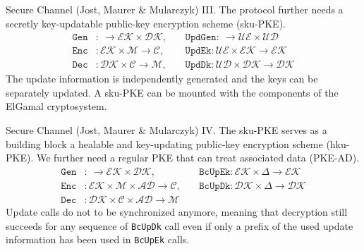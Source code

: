 \documentclass{beamer}
\begin{document}
\begin{frame}{Secure Channel (Jost, Maurer \& Mularczyk) III.}
  The protocol further needs a secretly key-updatable public-key encryption scheme (sku-PKE).
   \begin{align*}
     \texttt{Gen} & : \ \rightarrow \mathcal{EK} \times \mathcal{DK}, \
     && \texttt{UpdGen} : \ \rightarrow \mathcal{UE} \times \mathcal{UD} \\
     \texttt{Enc} & : \mathcal{EK} \times \mathcal{M} \rightarrow \mathcal{C}, \
     && \texttt{UpdEk} : \mathcal{UE} \times \mathcal{EK} \rightarrow \mathcal{EK} \\
     \texttt{Dec} & : \mathcal{DK} \times \mathcal{C} \rightarrow \mathcal{M}, \
     && \texttt{UpdDk} :  \mathcal{UD} \times \mathcal{DK} \rightarrow \mathcal{DK}
  \end{align*}
The update information is independently generated and the keys
can be separately updated. A sku-PKE can be mounted with the
components of the ElGamal cryptosystem.
\end{frame}

\begin{frame}{Secure Channel (Jost, Maurer \& Mularczyk) IV.}
  The sku-PKE serves as a building block a healable and key-updating
  public-key encryption scheme (hku-PKE). We further need a regular
  PKE that can treat associated data (PKE-AD).
  \begin{align*}
    \texttt{Gen} & : \ \rightarrow \mathcal{EK} \times \mathcal{DK}, \ &&
    \texttt{BcUpEk} : \mathcal{EK} \times \Delta \rightarrow \mathcal{EK} \\
    \texttt{Enc} & : \mathcal{EK} \times \mathcal{M} \times \mathcal{AD}
                   \rightarrow \mathcal{C}, \ &&
    \texttt{BcUpDk} : \mathcal{DK} \times \Delta \rightarrow \mathcal{DK} \\
    \texttt{Dec} & : \mathcal{DK} \times \mathcal{C} \times \mathcal{AD}
                   \rightarrow \mathcal{M}
  \end{align*}
  Update calls do not to be synchronized anymore, meaning that decryption still
  succeeds for any sequence of \texttt{BcUpDk} call even if only a prefix
  of the used update information has been used in \texttt{BcUpEk} calls.
\end{frame}
\end{document}

